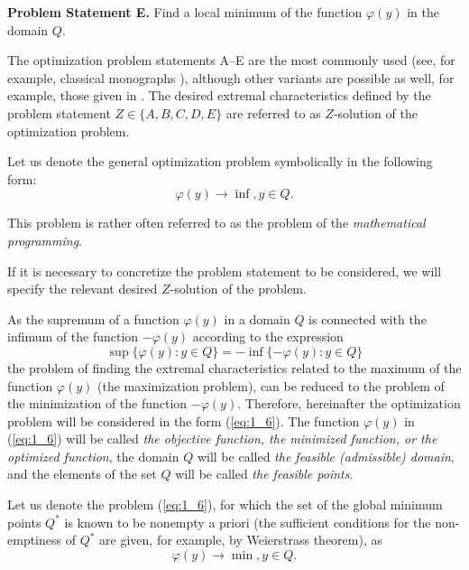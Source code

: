 \textbf{Problem Statement E.} Find a local minimum of the function $\varphi(y)$ in the domain $Q$.

The optimization problem statements A--E are the most commonly used (see, for example, classical monographs \cite{1_FloudasPardalos, 1_Himmelblau, 1_HorstPardalos, 1_HorstTuy, 1_McCormick, 1_Mockus, 1_Pinter,  1_SergKvasMonogr, 1_StrSergMon2000, 1_ZhigZhil}), although other variants are possible as well, for example, those given in \cite{1_Himmelblau}. The desired extremal characteristics defined by the problem statement $Z\in\{A, B, C, D, E\}$ are referred to as $Z$-solution of the optimization problem.

Let us denote the general optimization problem symbolically in the following form:
\begin{equation}
\label{eq:1_6}
\varphi(y)\rightarrow\inf, y \in Q.
\end{equation}

This problem is rather often referred to as the problem of the \textit{mathematical programming}.

If it is necessary to concretize the problem statement to be considered, we will specify the relevant desired $Z$-solution of the problem.

As  the supremum of a function $\varphi(y)$ in a domain $Q$ is connected with the infimum of the function $-\varphi(y)$ according to  the expression
\begin{displaymath}
\sup\{\varphi(y):y \in Q\} = -\inf\{-\varphi(y):y \in Q\}
\end{displaymath}
the problem of finding the extremal characteristics related to the maximum of the function $\varphi(y)$ (the maximization problem), can be reduced to the problem of the minimization of the function $-\varphi(y)$. Therefore, hereinafter the optimization problem will be considered in the form (\ref{eq:1_6}). The function $\varphi(y)$ in (\ref{eq:1_6}) will be called \textit{the objective function, the minimized function, or the optimized function},  the domain $Q$ will be called \textit{the feasible (admissible) domain}, and the elements of the set $Q$ will be called \textit{the feasible points}.

Let us denote the problem (\ref{eq:1_6}), for which the set of the global minimum points $Q^*$ is known to be nonempty a priori (the sufficient conditions for the non-emptiness of $Q^*$ are given, for example, by Weierstrass theorem), as
\begin{equation}
\label{eq:1_7}
\varphi(y)\rightarrow\min, y \in Q.
\end{equation}

